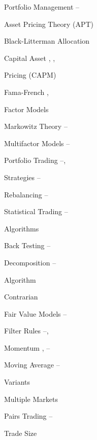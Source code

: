 \begin{multicols}{2}
\noindent Portfolio Management \hfill \pageref{in:portman1}--\pageref{in:portman2} \par
\twoindent Asset Pricing Theory (APT) \hfill \pageref{in:apt} \par
\twoindent Black-Litterman Allocation \hfill \pageref{in:allo} \par 
\twoindent Capital Asset \hfill \pageref{in:capm1}, \pageref{in:capm2}, \pageref{in:capm3} \par
\hspace{0.75cm} Pricing (CAPM) \par 
\twoindent Fama-French \hfill \pageref{in:fama1}, \pageref{in:fama2} \par \hspace{0.75cm} Factor Models \par 
\twoindent Markowitz Theory \hfill \pageref{in:mark1}--\pageref{in:mark2} \par
\twoindent Multifactor Models \hfill \pageref{in:mfm1}--\pageref{in:mfm2} \par
\twoindent Portfolio Trading \hfill \pageref{in:ports1}--\pageref{in:ports2}, \par \hspace{0.75cm} Strategies \hfill \pageref{in:ports3}--\pageref{in:ports4} \par
\twoindent Rebalancing \hfill \pageref{in:rebalance1}--\pageref{in:rebalance2} \par
\vspace{\baselineskip}


\noindent Statistical Trading \hfill \pageref{in:sta1}--\pageref{in:sta2} \par \hspace{0.75cm} Algorithms \par
\twoindent Back Testing \hfill \pageref{in:back1}--\pageref{in:back2} \par
\twoindent Decomposition \hfill \pageref{in:decomp1}--\pageref{in:decomp2} \par \hspace{0.75cm} Algorithm \par 
\twoindent Contrarian \hfill \pageref{in:contrary} \par
\twoindent Fair Value Models \hfill \pageref{in:fvm1}--\pageref{in:fvm2} \par
\twoindent Filter Rules \hfill \pageref{in:filter1}--\pageref{in:filter2}, \pageref{in:filter3} \par
\twoindent Momentum \hfill \pageref{in:mom1}, \pageref{in:mom2}--\pageref{in:mom3} \par
\twoindent Moving Average \hfill \pageref{in:mva1}--\pageref{in:mva2} \par \hspace{0.75cm} Variants \par 
\twoindent Multiple Markets \hfill \pageref{in:multmark} \par
\twoindent Pairs Trading \hfill \pageref{in:pairs1}--\pageref{in:pairs2} \par
\twoindent Trade Size \hfill \pageref{in:tradesize} \par
\vspace{\baselineskip}



\end{multicols}
